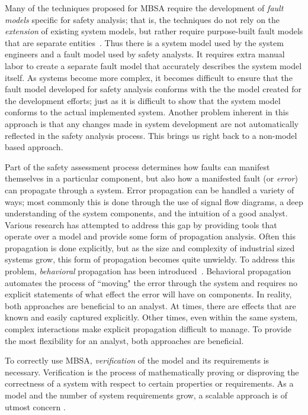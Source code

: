 Many of the techniques proposed for MBSA require the development of {\em fault models} specific for safety analysis; that is, the techniques do not rely on the \emph{extension} of existing system models, but rather require purpose-built fault models that are separate entities~\cite{symbAltaRica, DBLP:conf/tacas/BittnerBCCGGMMZ16, info8010007, Gudemann:2010:FQQ:1909626.1909813}. Thus there is a system model used by the system engineers and a fault model used by safety analysts. It requires extra manual labor to create a separate fault model that accurately describes the system model itself. As systems become more complex, it becomes difficult to ensure that the fault model developed for safety analysis conforms with the the model created for the development efforts; just as it is difficult to show that the system model conforms to the actual implemented system. Another problem inherent in this approach is that any changes made in system development are not automatically reflected in the safety analysis process. This brings us right back to a non-model based approach.

Part of the safety assessment process determines how faults can manifest themselves in a particular component, but also how a manifested fault (or \emph{error}) can propagate through a system. Error propagation can be handled a variety of ways; most commonly this is done through the use of signal flow diagrams, a deep understanding of the system components, and the intuition of a good analyst. Various research has attempted to address this gap by providing tools that operate over a model and provide some form of propagation analysis. Often this propagation is done explicitly, but as the size and complexity of industrial sized systems grow, this form of propagation becomes quite unwieldy. To address this problem, \emph{behavioral} propagation has been introduced~\cite{DBLP:conf/tacas/BittnerBCCGGMMZ16,stewart2020safety}. Behavioral propagation automates the process of ``moving" the error through the system and requires no explicit statements of what effect the error will have on components. In reality, both approaches are beneficial to an analyst. At times, there are effects that are known and easily captured explicitly. Other times, even within the same system, complex interactions make explicit propagation difficult to manage. To provide the most flexibility for an analyst, both approaches are beneficial.

To correctly use MBSA, \emph{verification} of the model and its requirements is necessary. Verification is the process of mathematically proving or disproving the correctness of a system with respect to certain properties or requirements. As a model and the number of system requirements grow, a scalable approach is of utmost concern . 

